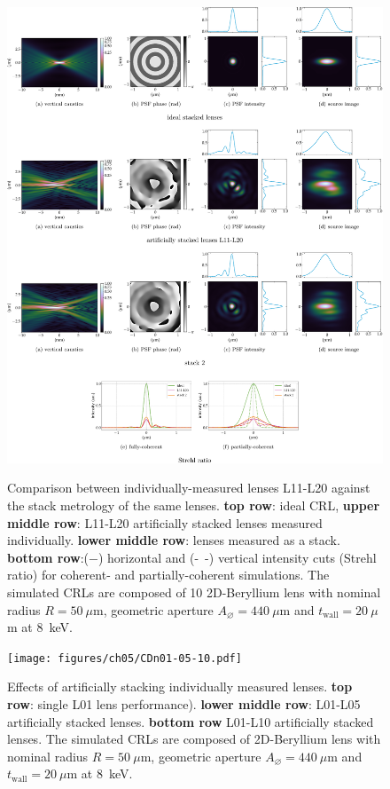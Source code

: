\begin{refsection}
\begin{figure}[t]
        \centering
        {\includegraphics[width=1\linewidth]{figures/ch05/CDo_vs_CDoStack.pdf}}
        \caption[Artificially stacked lenses L11-L21 vs. stack 2 comparison]{Comparison between individually-measured lenses L11-L20 against the stack metrology of the same lenses. \textbf{top row}: ideal CRL, \textbf{upper middle row}: L11-L20 artificially stacked lenses measured individually. \textbf{lower middle row}: lenses measured as a stack. \textbf{bottom row}:($-$) horizontal and (-~-) vertical intensity cuts (Strehl ratio) for coherent- and partially-coherent simulations. The simulated CRLs are composed of 10 2D-Beryllium lens with nominal radius $R=50~\mu\text{m}$, geometric aperture $A_{\diameter}=440~\mu\text{m}$ and $t_\text{wall}=20~\mu$m at 8~keV.}\label{fig:CDo_vs_CDoStack}
\end{figure}

\begin{figure}[t]
        \centering
        {\texttt{[image: figures/ch05/CDn01-05-10.pdf]}}
        \caption[Effects of stacking lenses]{Effects of artificially stacking individually measured lenses. \textbf{top row}: single L01 lens performance). \textbf{lower middle row}: L01-L05 artificially stacked lenses. \textbf{bottom row} L01-L10 artificially stacked lenses. The simulated CRLs are composed of 2D-Beryllium lens with nominal radius $R=50~\mu\text{m}$, geometric aperture $A_{\diameter}=440~\mu\text{m}$ and $t_\text{wall}=20~\mu$m at 8~keV.}\label{fig:CDn01-05-10}
\end{figure}


\end{refsection}
